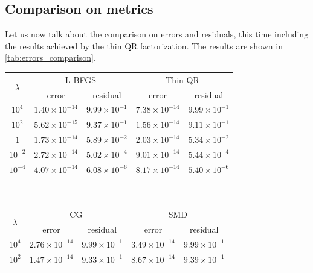 \subsection{Comparison on metrics}
Let us now talk about the comparison on errors and residuals, this time including the results achieved by the thin QR factorization. The results are shown in \autoref{tab:errors_comparison}.
\begin{table}[H]
\centering
\begin{tabular}{c|c|c|c|c}
    \hline \hline
    \multirow{2}{*}{$\lambda$} & \multicolumn{2}{c|}{L-BFGS} & \multicolumn{2}{c}{Thin QR} \\ \cline{2-5}
    & error & residual & error & residual \\ \hline \hline
    
    \rowcolor{gray!30} $10^4$ & $1.40 \times 10^{-14}$ &$9.99 \times 10^{-1}$& $7.38 \times 10^{-14}$ & $9.99 \times 10^{-1}$  \\
    
    $10^2$ & $5.62 \times 10^{-15}$ & $9.37 \times 10^{-1}$ & $1.56\times 10^{-14}$ & $9.11 \times 10^{-1}$ \\
    
    \rowcolor{gray!30} $1$ & $1.73 \times 10^{-14}$ &$5.89 \times 10^{-2}$ & $2.03 \times 10^{-14}$ & $5.34 \times 10^{-2}$ \\
    
    $10^{-2}$ & $2.72 \times 10^{-14}$ & $5.02 \times 10^{-4}$ & $9.01 \times 10^{-14}$ & $5.44 \times 10^{-4}$ \\
    
    \rowcolor{gray!30} $10^{-4}$& $4.07 \times 10^{-14}$& $6.08 \times 10^{-6}$ & $8.17 \times 10^{-14}$ & $5.40 \times 10^{-6}$\\
    \hline
    
    \end{tabular} \\
    \begin{tabular}{c|c|c|c|c}
    \hline
    \multirow{2}{*}{$\lambda$} & \multicolumn{2}{c|}{CG} & \multicolumn{2}{c}{SMD} \\ \cline{2-5}
    & error & residual & error & residual \\ \hline \hline
    
    \rowcolor{gray!30} $10^4$ & $2.76 \times 10^{-14}$ & $ 9.99 \times 10^{-1}$& $3.49 \times 10^{-14}$ & $9.99 \times 10^{-1}$  \\
    
    $10^2$ & $ 1.47 \times 10^{-14}$ & $ 9.33 \times 10^{-1}$ & $8.67\times 10^{-14}$ & $9.39 \times 10^{-1}$ \\
    

\end{tabular}
\end{table}
